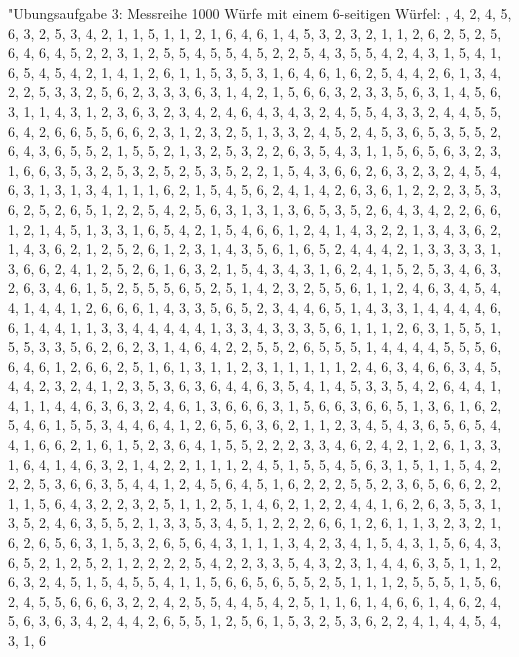 \documentclass[fleqn,a4paper,12pt]{article}
\begin{document}
	  "Ubungsaufgabe 3: \newline
	Messreihe 1000 Würfe mit einem 6-seitigen Würfel: , 4, 2, 4, 5, 6, 3, 2, 5, 3, 4, 2, 1, 1, 5, 1, 1, 2, 1, 6, 4, 6, 1, 4, 5, 3, 2, 3, 2, 1, 1, 2, 6, 2, 5, 2, 5, 6, 4, 6, 4, 5, 2, 2, 3, 1, 2, 5, 5, 4, 5, 5, 4, 5, 2, 2, 5, 4, 3, 5, 5, 4, 2, 4, 3, 1, 5, 4, 1, 6, 5, 4, 5, 4, 2, 1, 4, 1, 2, 6, 1, 1, 5, 3, 5, 3, 1, 6, 4, 6, 1, 6, 2, 5, 4, 4, 2, 6, 1, 3, 4, 2, 2, 5, 3, 3, 2, 5, 6, 2, 3, 3, 3, 6, 3, 1, 4, 2, 1, 5, 6, 6, 3, 2, 3, 3, 5, 6, 3, 1, 4, 5, 6, 3, 1, 1, 4, 3, 1, 2, 3, 6, 3, 2, 3, 4, 2, 4, 6, 4, 3, 4, 3, 2, 4, 5, 5, 4, 3, 3, 2, 4, 4, 5, 5, 6, 4, 2, 6, 6, 5, 5, 6, 6, 2, 3, 1, 2, 3, 2, 5, 1, 3, 3, 2, 4, 5, 2, 4, 5, 3, 6, 5, 3, 5, 5, 2, 6, 4, 3, 6, 5, 5, 2, 1, 5, 5, 2, 1, 3, 2, 5, 3, 2, 2, 6, 3, 5, 4, 3, 1, 1, 5, 6, 5, 6, 3, 2, 3, 1, 6, 6, 3, 5, 3, 2, 5, 3, 2, 5, 2, 5, 3, 5, 2, 2, 1, 5, 4, 3, 6, 6, 2, 6, 3, 2, 3, 2, 4, 5, 4, 6, 3, 1, 3, 1, 3, 4, 1, 1, 1, 6, 2, 1, 5, 4, 5, 6, 2, 4, 1, 4, 2, 6, 3, 6, 1, 2, 2, 2, 3, 5, 3, 6, 2, 5, 2, 6, 5, 1, 2, 2, 5, 4, 2, 5, 6, 3, 1, 3, 1, 3, 6, 5, 3, 5, 2, 6, 4, 3, 4, 2, 2, 6, 6, 1, 2, 1, 4, 5, 1, 3, 3, 1, 6, 5, 4, 2, 1, 5, 4, 6, 6, 1, 2, 4, 1, 4, 3, 2, 2, 1, 3, 4, 3, 6, 2, 1, 4, 3, 6, 2, 1, 2, 5, 2, 6, 1, 2, 3, 1, 4, 3, 5, 6, 1, 6, 5, 2, 4, 4, 4, 2, 1, 3, 3, 3, 3, 1, 3, 6, 6, 2, 4, 1, 2, 5, 2, 6, 1, 6, 3, 2, 1, 5, 4, 3, 4, 3, 1, 6, 2, 4, 1, 5, 2, 5, 3, 4, 6, 3, 2, 6, 3, 4, 6, 1, 5, 2, 5, 5, 5, 6, 5, 2, 5, 1, 4, 2, 3, 2, 5, 5, 6, 1, 1, 2, 4, 6, 3, 4, 5, 4, 4, 1, 4, 4, 1, 2, 6, 6, 6, 1, 4, 3, 3, 5, 6, 5, 2, 3, 4, 4, 6, 5, 1, 4, 3, 3, 1, 4, 4, 4, 4, 6, 6, 1, 4, 4, 1, 1, 3, 3, 4, 4, 4, 4, 4, 1, 3, 3, 4, 3, 3, 3, 5, 6, 1, 1, 1, 2, 6, 3, 1, 5, 5, 1, 5, 5, 3, 3, 5, 6, 2, 6, 2, 3, 1, 4, 6, 4, 2, 2, 5, 5, 2, 6, 5, 5, 5, 1, 4, 4, 4, 4, 5, 5, 5, 6, 6, 4, 6, 1, 2, 6, 6, 2, 5, 1, 6, 1, 3, 1, 1, 2, 3, 1, 1, 1, 1, 1, 2, 4, 6, 3, 4, 6, 6, 3, 4, 5, 4, 4, 2, 3, 2, 4, 1, 2, 3, 5, 3, 6, 3, 6, 4, 4, 6, 3, 5, 4, 1, 4, 5, 3, 3, 5, 4, 2, 6, 4, 4, 1, 4, 1, 1, 4, 4, 6, 3, 6, 3, 2, 4, 6, 1, 3, 6, 6, 6, 3, 1, 5, 6, 6, 3, 6, 6, 5, 1, 3, 6, 1, 6, 2, 5, 4, 6, 1, 5, 5, 3, 4, 4, 6, 4, 1, 2, 6, 5, 6, 3, 6, 2, 1, 1, 2, 3, 4, 5, 4, 3, 6, 5, 6, 5, 4, 4, 1, 6, 6, 2, 1, 6, 1, 5, 2, 3, 6, 4, 1, 5, 5, 2, 2, 2, 3, 3, 4, 6, 2, 4, 2, 1, 2, 6, 1, 3, 3, 1, 6, 4, 1, 4, 6, 3, 2, 1, 4, 2, 2, 1, 1, 1, 2, 4, 5, 1, 5, 5, 4, 5, 6, 3, 1, 5, 1, 1, 5, 4, 2, 2, 2, 5, 3, 6, 6, 3, 5, 4, 4, 1, 2, 4, 5, 6, 4, 5, 1, 6, 2, 2, 2, 5, 5, 2, 3, 6, 5, 6, 6, 2, 2, 1, 1, 5, 6, 4, 3, 2, 2, 3, 2, 5, 1, 1, 2, 5, 1, 4, 6, 2, 1, 2, 2, 4, 4, 1, 6, 2, 6, 3, 5, 3, 1, 3, 5, 2, 4, 6, 3, 5, 5, 2, 1, 3, 3, 5, 3, 4, 5, 1, 2, 2, 2, 6, 6, 1, 2, 6, 1, 1, 3, 2, 3, 2, 1, 6, 2, 6, 5, 6, 3, 1, 5, 3, 2, 6, 5, 6, 4, 3, 1, 1, 1, 3, 4, 2, 3, 4, 1, 5, 4, 3, 1, 5, 6, 4, 3, 6, 5, 2, 1, 2, 5, 2, 1, 2, 2, 2, 2, 5, 4, 2, 2, 3, 3, 5, 4, 3, 2, 3, 1, 4, 4, 6, 3, 5, 1, 1, 2, 6, 3, 2, 4, 5, 1, 5, 4, 5, 5, 4, 1, 1, 5, 6, 6, 5, 6, 5, 5, 2, 5, 1, 1, 1, 2, 5, 5, 5, 1, 5, 6, 2, 4, 5, 5, 6, 6, 6, 3, 2, 2, 4, 2, 5, 5, 4, 4, 5, 4, 2, 5, 1, 1, 6, 1, 4, 6, 6, 1, 4, 6, 2, 4, 5, 6, 3, 6, 3, 4, 2, 4, 4, 2, 6, 5, 5, 1, 2, 5, 6, 1, 5, 3, 2, 5, 3, 6, 2, 2, 4, 1, 4, 4, 5, 4, 3, 1, 6 \newline
\end{document}
